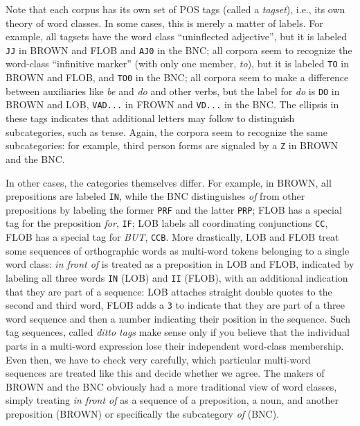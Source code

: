 Note that each corpus has its own set of POS tags (called a \textit{tagset}), i.e., its own theory of word classes. In some cases, this is merely a matter of labels. For example, all tagsets have the word class ``uninflected adjective'',  but it is labeled \texttt{JJ} in BROWN  and FLOB  and \texttt{AJ0} in the BNC;  all corpora seem to recognize the word\hyp{}class ``infinitive marker'' (with only one member, \textit{to}), but it is labeled \texttt{TO} in BROWN and FLOB,  and \texttt{TO0} in the BNC; all corpora seem to make a difference between auxiliaries like \textit{be} and \textit{do} and other verbs,  but the label for \textit{do} is \texttt{DO} in BROWN  and LOB,  \texttt{VAD...} in FROWN  and \texttt{VD...} in the BNC.  The ellipsis in these tags indicates that additional letters may follow to distinguish subcategories, such as tense. Again, the corpora seem to recognize the same subcategories: for example, third person forms are signaled by a \texttt{Z} in BROWN and the  BNC.

In other cases, the categories  themselves differ. For example, in BROWN,  all prepositions  are labeled \texttt{IN}, while the BNC  distinguishes \textit{of} from other prepositions  by labeling the former \texttt{PRF} and the latter \texttt{PRP}; FLOB  has a special tag  for the preposition  \textit{for}, \texttt{IF}; LOB  labels all coordinating  conjunctions  \texttt{CC}, FLOB  has a special tag for \textit{BUT}, \texttt{CCB}. More drastically, LOB  and FLOB  treat some sequences of orthographic words as multi\hyp{}word tokens belonging to a single word class: \textit{in front of} is treated as a preposition  in LOB  and FLOB,  indicated by labeling all three words \texttt{IN} (LOB) and \texttt{II} (FLOB), with an additional indication that they are part of a sequence: LOB  attaches straight double quotes to the second and third word, FLOB  adds a \texttt{3} to indicate that they are part of a three word sequence and then a number indicating their position in the sequence. Such tag  sequences, called \textit{ditto tags} make sense only if you believe that the individual parts in a multi\hyp{}word expression lose their independent word\hyp{}class membership. Even then, we have to check very carefully, which particular multi\hyp{}word sequences are treated like this and decide whether we agree. The makers of BROWN  and the BNC  obviously had a more traditional view of word classes, simply treating \textit{in front of} as a sequence of a preposition,  a noun,  and another preposition  (BROWN) or specifically the subcategory \textit{of}  (BNC).

